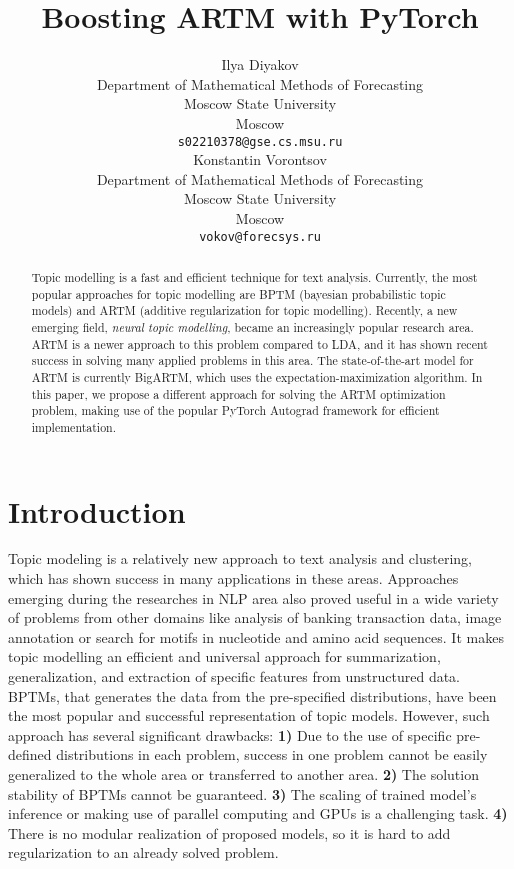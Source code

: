 \documentclass{article}
\title{Boosting ARTM with PyTorch}
\author{ \hspace{1mm} Ilya Diyakov \\
	Department of Mathematical Methods of Forecasting\\
	Moscow State University\\
	Moscow \\
	\texttt{s02210378@gse.cs.msu.ru} \\
	\And
	\hspace{1mm} Konstantin Vorontsov \\
	Department of Mathematical Methods of Forecasting\\
	Moscow State University\\
	Moscow \\
	\texttt{vokov@forecsys.ru} \\
}
\begin{document}
\maketitle

\begin{abstract}
	Topic modelling is a fast and efficient technique for text analysis. Currently, the most popular approaches for topic modelling are BPTM (bayesian probabilistic topic models) and ARTM (additive regularization for topic modelling). Recently, a new emerging field, \emph{neural topic modelling}, became an increasingly popular research area. ARTM is a newer approach to this problem compared to LDA, and it has shown recent success in solving many applied problems in this area. The state-of-the-art model for ARTM is currently BigARTM, which uses the expectation-maximization algorithm. In this paper, we propose a different approach for solving the ARTM optimization problem, making use of the popular PyTorch Autograd framework for efficient implementation.
\end{abstract}




\section{\centering Introduction}
\label{sec:introduction}
Topic modeling is a relatively new approach to text analysis and clustering, which has shown success in many applications in these areas. Approaches emerging during the researches in NLP area also proved useful in a wide variety of problems from other domains like analysis of banking transaction data, image annotation or search for motifs in nucleotide and amino acid sequences. It makes topic modelling an efficient and universal approach for summarization, generalization, and extraction of specific features from unstructured data. \\

BPTMs, that generates the data from the pre-specified distributions, have been the most popular and successful representation of topic models. However, such approach has several significant drawbacks: \textbf{1)} Due to the use of specific pre-defined distributions in each problem, success in one problem cannot be easily generalized to the whole area or transferred to another area. \textbf{2)} The solution stability of BPTMs cannot be guaranteed. \textbf{3)} The scaling of trained model's inference or making use of parallel computing and GPUs is a challenging task. \textbf{4)} There is no modular realization of proposed models, so it is hard to add regularization to an already solved problem. \\
\end{document}
